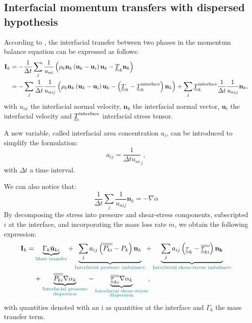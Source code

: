 \subsection{Interfacial momentum transfers with dispersed hypothesis}
According to \textcite{LivreIH}, the interfacial transfer between two phases in the momentum balance equation can be expressed as follows:
\begin{equation}
\begin{aligned}
\mathbf{I}_k & =-\frac{1}{\Delta t}\sum_j \frac{1}{u_{ni}}\left( \rho_k\mathbf{n}_k\left( \mathbf{u}_k-\mathbf{u}_i \right)\mathbf{u}_k-\underline{\underline{T}}_k\mathbf{n}_k \right)\\ 
&=-\sum_j \frac{1}{\Delta t}\frac{1}{u_{nij}} \left( \rho_k\mathbf{n}_k\left( \mathbf{u}_k-\mathbf{u}_i \right)\mathbf{u}_k-\left( \underline{\underline{T}}_k-\underline{\underline{T}}^{\text{interface}}_{k} \right)\mathbf{n}_k \right)+\sum_j \underline{\underline{T}}^{\text{interface}}_{k}\frac{1}{\Delta t}\frac{1}{u_{nij}}\mathbf{n}_k,
\end{aligned}
\end{equation}
with $u_{ni}$ the interfacial normal velocity, $\mathbf{n}_k$ the interfacial normal vector, $\mathbf{u}_i$ the interfacial velocity and $\underline{\underline{T}}^{\text{interface}}$ interfacial stress tensor.

A new variable, called interfacial area concentration $a_i$, can be introduced to simplify the formulation:
\begin{equation}
    a_{ij}=\frac{1}{\Delta t u_{ni}}_j,
\end{equation}
with $\Delta t$ a time interval. 

We can also notice that:
\begin{equation}
\frac{1}{\Delta t}\sum_j \frac{1}{u_{nij}}\mathbf{n}_k=- \nabla \alpha
\end{equation}
By decomposing the stress into pressure and shear-stress components, subscripted $i$ at the interface, and incorporating the mass loss rate $\dot{m}$, we obtain the following expression:
\begin{equation}
\begin{aligned}
\mathbf{I}_k= &\underbrace{\Gamma_k \tilde{\mathbf{u}}_{ki}}_{\color{myteal}\text{Mass transfer}} + \underbrace{\sum_j a_{ij}\parent{\overline{\overline{P_{ki}}}-P_k}\mathbf{n}_k}_{\color{myteal}\text{Interfacial pressure imbalance}} + \underbrace{\sum_j a_{ij} \parent{{\ull{\tau}}_{k} - \overline{\overline{{\ull{\tau}}_{ki}}}}\mathbf{n_k}}_{\color{myteal}\text{Interfacial shear-stress imbalance}}\\ 
& +\underbrace{\overline{\overline{P_{ki}}}\nabla \alpha_k}_{\color{myteal}\substack{\text{Interfacial pressure}\\\text{dispersion}}} - \underbrace{\overline{\overline{{\ull{\tau}}_{ki}}}\nabla \alpha_k}_{\color{myteal}\substack{\text{Interfacial shear-stress}\\\text{dispersion}}},
\end{aligned}
\end{equation}
with quantities denoted with an i as quantities at the interface and $\Gamma_k$ the mass transfer term.

